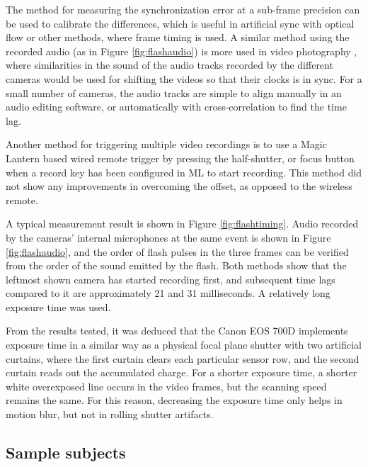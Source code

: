The method for measuring the synchronization error at a sub-frame precision can be used to calibrate the differences, which is useful in artificial sync with optical flow or other methods, where frame timing is used.
A similar method using the recorded audio (as in Figure \ref{fig:flashaudio}) is more used in video photography \cite{pluraleyes,premierepromerge}, where similarities in the sound of the audio tracks recorded by the different cameras would be used for shifting the videos so that their clocks is in sync.
For a small number of cameras, the audio tracks are simple to align manually in an audio editing software, or automatically with cross-correlation to find the time lag.

Another method for triggering multiple video recordings is to use a Magic Lantern based wired remote trigger by pressing the half-shutter, or focus button when a record key has been configured in ML to start recording.
This method did not show any improvements in overcoming the offset, as opposed to the wireless remote.

A typical measurement result is shown in Figure \ref{fig:flashtiming}.
Audio recorded by the cameras' internal microphones at the same event is shown in Figure \ref{fig:flashaudio}, and the order of flash pulses in the three frames can be verified from the order of the sound emitted by the flash.
Both methods show that the leftmost shown camera has started recording first, and subsequent time lags compared to it are approximately 21 and 31 milliseconds.
A relatively long exposure time was used.

From the results tested, it was deduced that the Canon EOS 700D implements exposure time in a similar way as a physical focal plane shutter with two artificial curtains, where the first curtain clears each particular sensor row, and the second curtain reads out the accumulated charge.
For a shorter exposure time, a shorter white overexposed line occurs in the video frames, but the scanning speed remains the same.
For this reason, decreasing the exposure time only helps in motion blur, but not in rolling shutter artifacts.

\subsection{Sample subjects} \label{sec:samplesubjects}


